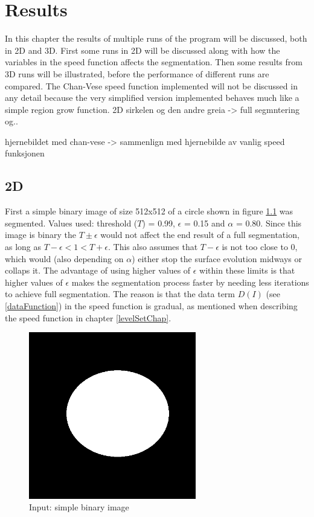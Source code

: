 \chapter{Results}
In this chapter the results of multiple runs of the program will be discussed, both in 2D and 3D. First some runs in 2D will be discussed along with how the variables in the speed function affects the segmentation. Then some results from 3D runs will be illustrated, before the performance of different runs are compared. The Chan-Vese speed function implemented will not be discussed in any detail because the very simplified version implemented behaves much like a simple region grow function.
2D    
sirkelen og den andre greia -> full segmntering og..    

hjernebildet med chan-vese -> sammenlign med hjernebilde av vanlig speed funksjonen   

\section{2D}
First a simple binary image of size 512x512 of a circle shown in figure \ref{circle} was segmented. Values used: threshold ($T$) = 0.99, $\epsilon$ = 0.15 and $\alpha$ = 0.80. Since this image is binary the $T \pm \epsilon$ would not affect the end result of a full segmentation, as long as $T - \epsilon < 1 < T + \epsilon$. This also assumes that $T - \epsilon$ is not too close to 0, which would (also depending on $\alpha$) either stop the surface evolution midways or collaps it. The advantage of using higher values of $\epsilon$ within these limits is that higher values of $\epsilon$ makes the segmentation process faster by needing less iterations to achieve full segmentation. The reason is that the data term $D(I)$ (see \ref{dataFunction}) in the speed function is gradual, as mentioned when describing the speed function in chapter \ref{levelSetChap}.
\begin{figure}[h!]
\centering
\includegraphics[width=0.65\textwidth]{results/2D/circle}
\caption{Input: simple binary image}
\label{circle}
\end{figure} 

